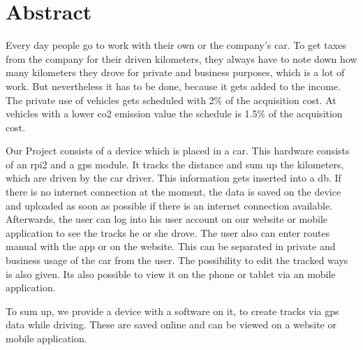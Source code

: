 \chapter*{Abstract}
Every day people go to work with their own or the company's car. To get taxes from the company for their driven kilometers, they always have to note down how many kilometers they drove for private and business purposes, which is a lot of work. But nevertheless it has to be done, because it gets added to the income. The private use of vehicles gets scheduled with 2\% of the acquisition cost. At vehicles with a lower \gls{co2} emission value the schedule is 1.5\% of the acquisition cost.

Our Project consists of a device which is placed in a car. This hardware consists of an \gls{rpi2} and a \gls{gps} module. It tracks the distance and sum up the kilometers, which are driven by the car driver. This information gets inserted into a \gls{db}. If there is no internet connection at the moment, the data is saved on the device and uploaded as soon as possible if there is an internet connection available. Afterwards, the user can log into his user account on our website or mobile application to see the tracks he or she drove. The user also can enter routes manual with the app or on the website. This can be separated in private and business usage of the car from the user. The possibility to edit the tracked ways is also given. Its also possible to view it on the phone or tablet via an mobile application.

To sum up, we provide a device with a software on it, to create tracks via \gls{gps} data while driving. These are saved online and can be viewed on a website or mobile application.